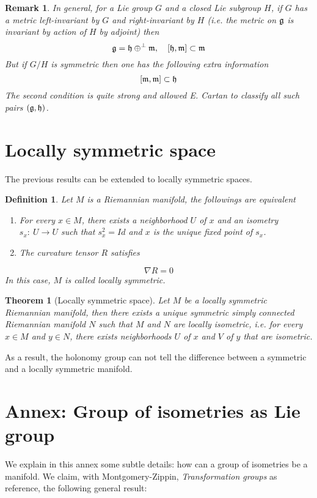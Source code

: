 \documentclass[11pt]{article}
\newtheorem{remark}{Remark}
\newtheorem{theorem}{Theorem}
\newtheorem{definition}{Definition}
\begin{document}
\begin{remark}
In general, for a Lie group \(G\) and a closed Lie subgroup \(H\), if \(G\) has a metric left-invariant by
\(G\) and right-invariant by \(H\) (i.e. the metric on \(\frak{g}\) is invariant by action of \(H\) by
adjoint) then 
\[ 
\frak{g} = \frak{h} \oplus^\perp \frak{m},\quad [\frak{h},\frak{m}]\subset \frak{m}
\] 
But if \(G/H\) is symmetric then one has the following extra information 
\[
[\frak{m},\frak{m}]\subset \frak{h} 
\] 
The second condition is quite strong and allowed E. Cartan to
classify all such pairs \((\frak{g},\frak{h})\).
\end{remark}

\section{Locally symmetric space}
\label{sec:orgcebc7a0}
The previous results can be extended to locally symmetric spaces.

\begin{definition}
Let \(M\) is a Riemannian manifold, the followings are equivalent
\begin{enumerate}
\item For every \(x\in M\), there exists a neighborhood \(U\) of \(x\) and an isometry \(s_x:\
   U\longrightarrow U\) such that \(s_x^2=Id\) and \(x\) is the unique fixed point of \(s_x\).
\item The curvature tensor \(R\) satisfies
\end{enumerate}
\[
\nabla R = 0
\]
In this case, \(M\) is called  \emph{locally symmetric}.
\end{definition}

\begin{theorem}[Locally symmetric space]
\label{org3cf44da}
Let \(M\) be a locally symmetric Riemannian manifold, then there exists a unique symmetric simply
connected Riemannian manifold \(N\) such that \(M\) and \(N\) are locally isometric, i.e. for every
\(x\in M\) and \(y\in N\), there exists neighborhoods \(U\) of \(x\) and \(V\) of \(y\) that are isometric.
\end{theorem}

As a result, the holonomy group can not tell the difference between a symmetric and a locally
symmetric manifold.

\section{Annex: Group of isometries as Lie group}
\label{sec:org769b9bd}
We explain in this annex some subtle details: how can a group of isometries be a manifold. We claim, with
Montgomery-Zippin, \emph{Transformation groups} as reference, the following general result:
\end{document}
